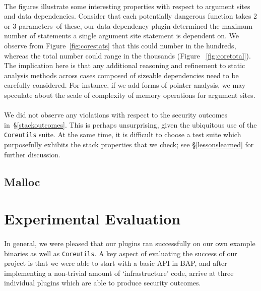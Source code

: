 \documentclass[letterpaper,11pt]{article}
\begin{document}
\paragraph{}
The figures illustrate some interesting properties with respect to argument
sites and data dependencies. Consider that each potentially dangerous function
takes 2 or 3 parameters--of these, our data dependency plugin determined the
maximum number of statements a single argument site statement is dependent on.
We observe from Figure~\ref{fig:corestats} that this could number in the hundreds,
whereas the total number could range in the thousands (Figure ~\ref{fig:coretotal}).
The implication here is that any additional reasoning and refinement to static
analysis methods across cases composed of sizeable dependencies need to be
carefully considered. For instance, if we add forms of pointer analysis,
we may speculate about the scale of complexity of memory operations for
argument sites.

\paragraph{}
We did not observe any violations with respect to the security outcomes
in~\S\ref{stackoutcomes}. This is perhaps unsurprising, given the ubiquitous
use of the \texttt{Coreutils} suite. At the same time, it is difficult to
choose a test suite which purposefully exhibits the stack properties that we
check; see \S\ref{lessonslearned} for further discussion.

\subsection{Malloc}


\section{Experimental Evaluation}

\paragraph{}
In general, we were pleased that our plugins ran successfully on our own
example binaries as well as \texttt{Coreutils}. A key aspect of evaluating
the success of our project is that we were able to start with a basic API in
BAP, and after implementing a non-trivial amount of `infrastructure' code,
arrive at three individual plugins which are able to produce security outcomes.
\end{document}
